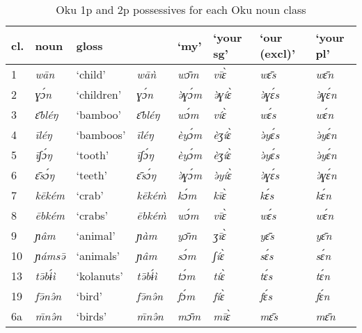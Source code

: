 \documentclass[output=paper]{langsci/langscibook}
\begin{document}
\begin{table}
 \caption{Oku 1p and 2p possessives for each Oku noun class}
 \label{extab:grassfields:7}
\begin{tabularx}{\textwidth}{lllXXlll}
\lsptoprule
cl. &  noun &  gloss &  &  ‘my’ &  ‘your sg’ &  ‘our (excl)’ &  ‘your pl’\\
\midrule
1 & \textit{wān} & ‘child’      & \textit{wāǹ} &  \textit{wɔ̄m} &  \textit{vīɛ̀} &  \textit{wɛ̄s} &  \textit{wɛ̄n}\\
2 & \textit{ɣɔ́n} & ‘children’   & \textit{ɣɔ́n} &  \textit{ə̀ɣɔ́m} &  \textit{ə̀ɣíɛ̀} &  \textit{ə̀ɣɛ́s} &  \textit{ə̀ɣɛ́n}\\
3 & \textit{ɛ̄bléŋ} & ‘bamboo’   & \textit{ɛ̄bléŋ} &  \textit{wɔ́m} &  \textit{víɛ̀} &  \textit{wɛ́s} &  \textit{wɛ́n}\\
4 & \textit{īléŋ} & ‘bamboos’   & \textit{īléŋ} &  \textit{èyɔ́m} &  \textit{èʒíɛ̀} &  \textit{ə̀yɛ́s} &  \textit{ə̀yɛ́n}\\
5 & \textit{īʃɔ́ŋ} & ‘tooth’     & \textit{īʃɔ́ŋ} &  \textit{èyɔ́m} &  \textit{èʒíɛ̀} &  \textit{ə̀yɛ́s} &  \textit{ə̀yɛ́n}\\
6 & \textit{ɛ̄sɔ́ŋ} & ‘teeth’     & \textit{ɛ̄sɔ́ŋ} &  \textit{ə̀ɣɔ́m} &  \textit{ə̀yíɛ̀} &  \textit{ə̀ɣɛ́s} &  \textit{ə̀ɣɛ́n}\\
7 & \textit{kēkém} & ‘crab’     & \textit{kēké\`{m}} &  \textit{kɔ́m} &  \textit{kīɛ̀} &  \textit{kɛ́s} &  \textit{kɛ́n}\\
8 & \textit{ēbkém} & ‘crabs’    & \textit{ēbké\`{m}} &  \textit{wɔ́m} &  \textit{vīɛ̀} &  \textit{wɛ́s} &  \textit{wɛ́n}\\
9 & \textit{ɲâm} & ‘animal’     & \textit{ɲàm} &  \textit{yɔ̄m} &  \textit{ʒīɛ̀} &  \textit{yɛ̄s} &  \textit{yɛ̄n}\\
10 & \textit{ɲámsə̄} & ‘animals’ & \textit{ɲâm} &  \textit{sɔ́m} &  \textit{ʃíɛ̀} &  \textit{sɛ́s} &  \textit{sɛ́n}\\
13 & \textit{tə̄bɨ́ì} & ‘kolanuts’& \textit{tə̄bɨ́ì} &  \textit{tɔ́m} &  \textit{tíɛ̀} &  \textit{tɛ́s} &  \textit{tɛ́n}\\
19 & \textit{fə̄nə̂n} & ‘bird’    & \textit{fə̄nə̂n} &  \textit{fɔ́m} &  \textit{fíɛ̀} &  \textit{fɛ́s} &  \textit{fɛ́n}\\
6a & \textit{\={m}nə̂n} & ‘birds’& \textit{\={m}nə̂n} &  \textit{mɔ̄m} &  \textit{mīɛ̀} &  \textit{mɛ̄s} &  \textit{mɛ̄n}\\

\end{tabularx}
\end{table}
\end{document}
